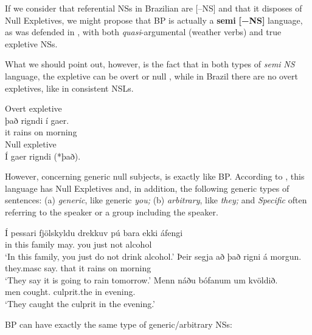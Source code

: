 \documentclass[output=paper]{langsci/langscibook}
\begin{document}
If we consider that referential NSs in Brazilian  are [–NS]
and that it disposes of Null Expletives, we might propose that
\gls{BP} is actually a \textbf{semi} \textbf{[−NS]}
language, as was defended in \citet{Saab2016}, with both
\emph{quasi}-argumental  (weather verbs) and true expletive NSs.

What we should point out, however, is the fact that in both types of
\emph{semi} \emph{NS} language, the expletive can be overt or null
\citep{Biberauer2010}, while in Brazil there are no overt expletives, like in
consistent \gls{NSL}s.\newpage

\ea%
    \label{ex:key:26.50ice}
    \ea Overt expletive\\
    \gll    það rigndi í  gaer.\\
            it rains on morning\\
    \ex Null expletive\\
        Í gaer rigndi  (*það).
    \z
\z

However, concerning generic null subjects,  is exactly like
\gls{BP}. According to \citet{SigurdssonEgerland2009},
this language has Null Expletives and, in addition, the following generic types
of sentences: (a) \emph{generic}, like generic  \emph{you;} (b)
\emph{arbitrary}, like  \emph{they;} and \emph{Specific} often
referring to the speaker or a group including the speaker.

\ea%
    \label{ex:key:26.50}
    \ea
	\gll	Í pessari      fjölskyldu drekkuv      pú bara ekki áfengi\\
			in this      family  may.\Tsg{}  you just not alcohol\\
	\glt	\enquote*{In this family, you just do not drink alcohol.}
    \ex
	\gll	Þeir           segja     að það rigni á morgun.\\
			they.masc say.\Tpl{} that it rains on morning\\
	\glt	\enquote*{They say it is going to rain tomorrow.}
    \ex
	\gll	Menn náðu bófanum um kvöldið.\\
			men cought.\Tpl{} culprit.the in evening.\\
	\glt	\enquote*{They caught the culprit in the evening.}
    \z
\z

\gls{BP} can have exactly the same type of generic/arbitrary NSs:
\end{document}
